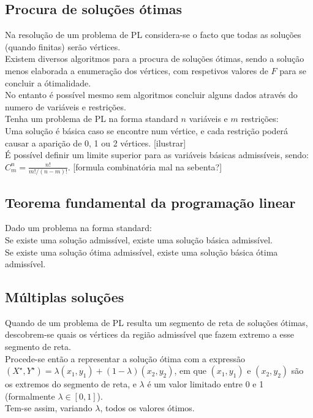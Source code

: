 \documentclass[]{report}
\begin{document}
\subsection{Procura de soluções ótimas}
Na resolução de um problema de PL considera-se o facto que todas as soluções (quando finitas) serão vértices.\\
Existem diversos algoritmos para a procura de soluções ótimas, sendo a solução menos elaborada a enumeração dos vértices, com respetivos valores de $F$ para se concluir a ótimalidade.\\
No entanto é possível mesmo sem algoritmos concluir alguns dados através do numero de variáveis e restrições.\\[0.5cm]
Tenha um problema de PL na forma standard $n$ variáveis e $m$ restrições:\\
Uma solução é básica caso se encontre num vértice, e cada restrição poderá causar a aparição de 0, 1 ou 2 vértices. [ilustrar]\\
É possível definir um limite superior para as variáveis básicas admissíveis, sendo: $C^n_m = \frac{n!}{m! / (n-m)!}$. [formula combinatória mal na sebenta?]
\subsection{Teorema fundamental da programação linear}
Dado um problema na forma standard:\\
Se existe uma solução admissível, existe uma solução básica admissível.\\
Se existe uma solução ótima admissível, existe uma solução básica ótima admissível.
\subsection{Múltiplas soluções}
Quando de um problema de PL resulta um segmento de reta de soluções ótimas, descobrem-se quais os vértices da região admissível que fazem extremo a esse segmento de reta.\\
Procede-se então a representar a solução ótima com a expressão $(X^\star, Y^\star) = \lambda (x_1, y_1)+(1-\lambda)(x_2, y_2)$, em que $(x_1, y_1)$ e $(x_2, y_2)$ são os extremos do segmento de reta, e $\lambda$ é um valor limitado entre 0 e 1 (formalmente $\lambda \in [0,1]$).\\
Tem-se assim, variando $\lambda$, todos os valores ótimos.
\end{document}
